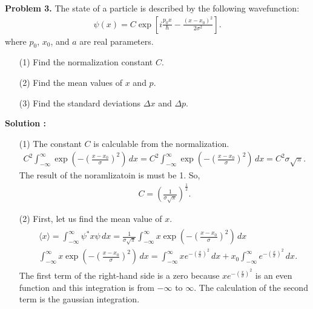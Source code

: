 \documentclass[floatfix,nofootinbib,superscriptaddress,fleqn]{revtex4-2}
\begin{document}
\noindent \textbf{Problem 3.} 
The state of a particle is described by the following wavefunction:
\begin{align*}
\psi(x) = C\exp\left[
i\frac{p_0 x}{\hbar} - \frac{(x-x_0)^2}{2\sigma^2} 
\right].
\end{align*}
where $p_0$, $x_0$, and $a$ are real parameters. 
\begin{itemize}
\item[(1)] Find the normalization constant $C$.
\item[(2)] Find the mean values of $x$ and $p$.
\item[(3)] Find the standard deviations $\Delta x$ and $\Delta p$.
\end{itemize}
\noindent \textbf{Solution : }
\begin{itemize}
  \item[(1)] The constant $C$ is calculable from the normalization.
  \begin{align*}
    C^2\int_{-\infty}^{\infty} 
    \exp\left(-{\left(\frac{x-x_0}{\sigma} \right)}^2\right)\,dx 
    = C^2\int_{-\infty}^{\infty}
    \exp\left(-{\left(\frac{x-x_0}{\sigma} \right)}^2\right)\,dx 
    = C^2\sigma \sqrt{\pi}.
  \end{align*}
The result of the noramlizatoin is must be 1. So,
  \begin{align}
    C = {\left(\frac{1}{\sigma \sqrt{\pi}}\right)}^{\frac{1}{2}}.
  \end{align}
\item[(2)]First, let us find the mean value of $x$.
  \begin{align*}
    \begin{split}
      &\langle x \rangle=\int_{-\infty}^{\infty}\psi^*x\psi\,dx 
      = \frac{1}{\sigma\sqrt{\pi}}\int_{-\infty}^{\infty} x 
      \exp\left(-{\left( \frac{x-x_0}{\sigma} \right)}^2\right)\,dx \\
      &\int_{-\infty}^{\infty} x 
      \exp\left(-{\left(\frac{x-x_0}{\sigma} \right)}^2\right)\,dx 
      = \int_{-\infty}^{\infty} x 
      e^{-{\left(\frac{x}{\sigma}\right)}^2}\,dx 
      +x_0\int_{-\infty}^{\infty} 
      e^{-{\left(\frac{x}{\sigma}\right)}^2}\,dx.
    \end{split}
  \end{align*}
The first term of the right-hand side is a zero 
because $x e^{-{\left(\frac{x}{\sigma}\right)}^2}$ 
is an even function and this integration is from $-\infty$ to $\infty$. 
The calculation of the second term is the gaussian integration.
  \begin{align*}

\end{align*}
\end{itemize}
\end{document}
